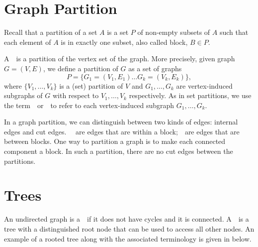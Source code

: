 \section{Graph Partition}
\label{sec:bg::graphs::partition}

\begin{gram}
Recall that a partition of a set $A$ is a set $P$ of non-empty subsets
of $A$ such that each element of $A$ is in exactly one subset, also
called block, $B \in P$.
%
\end{gram}

\begin{definition}
\label{def:bg::graphs::partition}
A~~is a partition of the vertex set of the
graph.
%
More precisely, given graph $G = (V,E)$, we define a partition of $G$
as a set of graphs 
\[
P = \{ G_1 = (V_1,E_1) \ldots G_k = (V_k,E_k) \},
\]
where $\{V_1, \ldots, V_k\}$ is a (set) partition of $V$ and $G_1,
\ldots, G_k$ are vertex-induced subgraphs of $G$ with respect to $V_1,
\ldots, V_k$ respectively.  
%
As in set partitions, we use the term~~or~~to
refer to each vertex-induced subgraph $G_1, \ldots, G_k$.
\end{definition}

\begin{definition}
\label{def:bg::graphs::partition::edges}
%
In a graph partition, we can distinguish between two kinds of edges:
internal edges and cut edges. ~~are edges that
are within a block;~~are edges that are between
blocks.
%
One way to partition a graph is to make each connected component a
block. In such a partition, there are no cut edges between the
partitions.
\end{definition}

\section{Trees}
\label{sec:bg::graphs::trees}

\begin{definition}[Tree]
\label{def:bg::graphs::tree}
An undirected graph is a~~if it does not have cycles and it is
connected.  A~~is a tree with a distinguished root
node that can be used to access all other nodes.
%
%
An example of a rooted tree along with
the associated terminology is given in below.
\end{definition}


